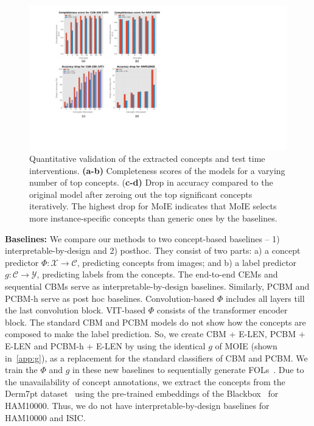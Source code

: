 \begin{figure}[h]
\begin{center}
\centerline{\includegraphics[width=\columnwidth]{figures/main/CUB_HAM.pdf}}
\caption{Quantitative validation of the extracted concepts and test time interventions. \textbf{(a-b)} 
Completeness scores of the models for a varying number of top concepts. (\textbf{c-d)} Drop in accuracy compared to the original model after zeroing out the top significant concepts iteratively. The highest drop for MoIE indicates that MoIE selects more instance-specific concepts than generic ones by the baselines. 
}
\label{fig:valid_concepts}
\end{center}
\vskip -0.2in
\end{figure}


\textbf{Baselines:}
We compare our methods to two concept-based baselines -- 1) interpretable-by-design and 2) posthoc. They consist of two parts: a) a concept predictor $\Phi: \mathcal{X} \rightarrow \mathcal{C}$, predicting concepts from images; and b) a label predictor $g: \mathcal{C} \rightarrow \mathcal{Y}$, predicting labels from the concepts. The end-to-end CEMs and sequential CBMs serve as interpretable-by-design baselines. Similarly, PCBM and PCBM-h serve as post hoc baselines. Convolution-based $\Phi$ includes all layers till the last convolution block. VIT-based $\Phi$ consists of the transformer encoder block. The standard CBM and PCBM models do not show how the concepts are composed to make the label prediction. So, we create CBM + E-LEN, PCBM + E-LEN and PCBM-h + E-LEN by using the identical $g$ of MOIE (shown in~\cref{app:g}), as a replacement for the standard classifiers of CBM and 
PCBM. We train the $\Phi$ and $g$ in these new baselines to sequentially generate FOLs~\cite{barbiero2022entropy}. Due to the unavailability of concept annotations, we extract the concepts from the Derm7pt dataset~\cite{kawahara2018seven} using the pre-trained embeddings of the Blackbox~\cite{yuksekgonul2022post} for HAM10000. Thus, we do not have interpretable-by-design baselines for HAM10000 and ISIC.

